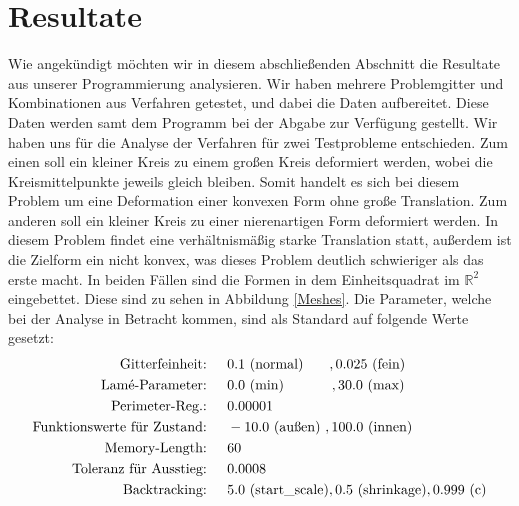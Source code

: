
\section{Resultate}\label{Chap_results}

Wie angekündigt möchten wir in diesem abschließenden Abschnitt die Resultate aus unserer Programmierung analysieren. Wir haben mehrere Problemgitter und Kombinationen aus Verfahren getestet, und dabei die Daten aufbereitet. Diese Daten werden samt dem Programm bei der Abgabe zur Verfügung gestellt.
Wir haben uns für die Analyse der Verfahren für zwei Testprobleme entschieden. Zum einen soll ein kleiner Kreis zu einem großen Kreis deformiert werden, wobei die Kreismittelpunkte jeweils gleich bleiben. Somit handelt es sich bei diesem Problem um eine Deformation einer konvexen Form ohne große Translation. Zum anderen soll ein kleiner Kreis zu einer nierenartigen Form deformiert werden. In diesem Problem findet eine verhältnismäßig starke Translation statt, außerdem ist die Zielform ein nicht konvex, was dieses Problem deutlich schwieriger als das erste macht. In beiden Fällen sind die Formen in dem Einheitsquadrat im $\mathbb{R}^2$ eingebettet. Diese sind zu sehen in Abbildung \ref{Meshes}. 
Die Parameter, welche bei der Analyse in Betracht kommen, sind als Standard auf folgende Werte gesetzt:
\begin{align*}
\text{Gitterfeinheit: \hspace{0.2cm} }& 0.1 \text{ (normal)} \hspace{0.65cm} ,0.025 \text{ (fein)} \\
\text{Lamé-Parameter: \hspace{0.2cm} }& 0.0 \text{ (min)} \hspace{1.2cm}  ,30.0 \text{ (max)} \\
\text{Perimeter-Reg.: \hspace{0.2cm} }& 0.00001 \\
\text{Funktionswerte für Zustand: \hspace{0.2cm} }& -10.0 \text{ (außen) },  100.0 \text{ (innen)} \\
\text{Memory-Length: \hspace{0.2cm} }& 60 \\
\text{Toleranz für Ausstieg: \hspace{0.2cm} }& 0.0008 \\
\text{Backtracking: \hspace{0.2cm} }& 5.0 \text{ (start\_scale)}, 0.5 \text{ (shrinkage)}, 0.999 \text{ (c)}
\end{align*}

